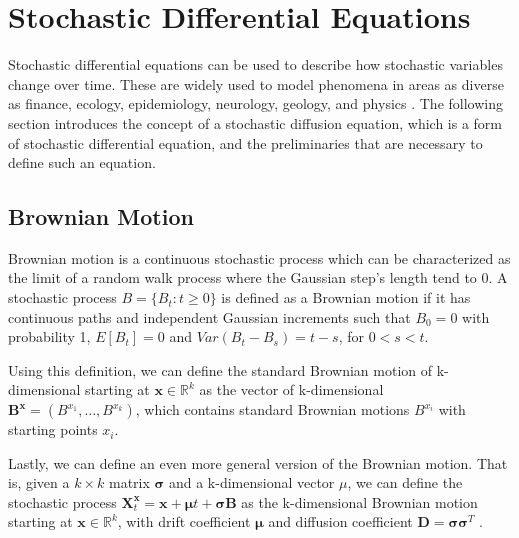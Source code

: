 
\section{Stochastic Differential Equations}
Stochastic differential equations can be used to describe how stochastic variables change over time. These are widely used to model phenomena in areas as diverse as finance, ecology, epidemiology, neurology, geology, and physics \parencite{iacus_simulation_2008}. The following section introduces the concept of a stochastic diffusion equation, which is a form of stochastic differential equation, and the preliminaries that are necessary to define such an equation.


\subsection{Brownian Motion}
Brownian motion is a continuous stochastic process which can be characterized as the limit of a random walk process where the Gaussian step's length tend to 0. A stochastic process $B = \{B_t:t\geq 0\}$ is defined as a Brownian motion if it has continuous paths and independent Gaussian increments such that $B_0 = 0$ with probability 1, $E[B_t] = 0$ and $Var(B_t - B_s) = t-s$, for $0 < s < t$\parencite{iacus_simulation_2008}.  


Using this definition, we can define the standard Brownian motion of k-dimensional starting at $\textbf{x} \in \mathbb{R}^k$ as the vector of k-dimensional $\mathbf{B}^\mathbf{x} = (B^{x_1}, \dots , B^{x_k})$, which contains standard Brownian motions $B^{x_i}$ with starting points $x_i$\parencite{bhattacharya_continuous_2023}.

Lastly, we can define an even more general version of the Brownian motion. That is, given a $k \times k$ matrix $\pmb{\sigma}$ and a k-dimensional vector $\mu$, we can define the stochastic process $\mathbf{X}_t^\mathbf{x} = \mathbf{x} + \pmb{\mu}t + \pmb{\sigma} \mathbf{B}$ as the k-dimensional Brownian motion starting at $\mathbf{x} \in \mathbb{R}^k$, with drift coefficient $\pmb{\mu}$ and diffusion coefficient $\mathbf{D} = \pmb{\sigma} \pmb{\sigma}^T$ \parencite{bhattacharya_continuous_2023}.

\cite{michelot_langevin_2019}


\begin{comment}

\subsection{Stochastic Integrals}
The integral of a function with respect to the Brownian motion is known as an Itô integral
$$I(X) = \int_0^T X(u)dB_u.$$

\parencite{iacus_simulation_2008}


Let $f(t)$ be a non-stochastic continuously differentiable function. Then

$$\int_\alpha^\beta f(s)dB_s = f(\beta)B_\beta - f(\alpha)B_\alpha - \int_\alpha^\beta B_sf'(s) ds   $$

\end{comment}

